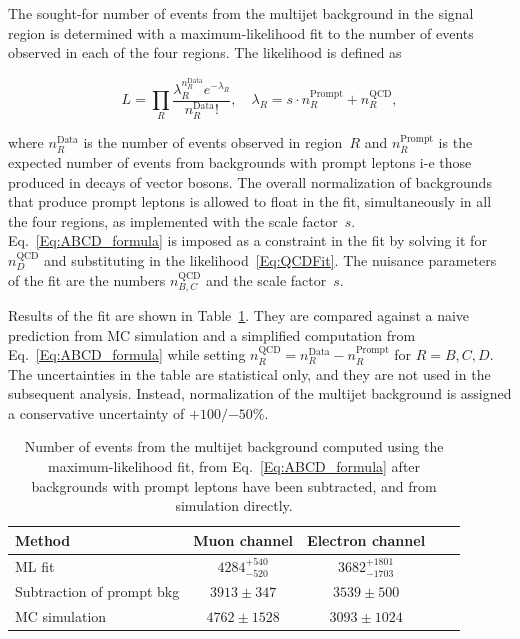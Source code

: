 The sought-for number of events from the multijet background in the signal region is determined with a maximum-likelihood fit to the number of events observed in each of the four regions.
The likelihood is defined as
\begin{linenomath}
\begin{equation}
  L = \prod_R \frac{\lambda_R^{n_R^\text{Data}} e^{-\lambda_R}}{n_R^\text{Data}!}, \quad \lambda_R = s \cdot n_R^\text{Prompt} + n_R^\text{QCD},
  \label{Eq:QCDFit}
\end{equation}
\end{linenomath}
where $n_R^\text{Data}$ is the number of events observed in region~$R$ and $n_R^\text{Prompt}$ is the expected number of events from backgrounds with prompt leptons i-e those produced in decays of vector bosons.
The overall normalization of backgrounds that produce prompt leptons is allowed to float in the fit, simultaneously in all the four regions, as implemented with the scale factor~$s$.
Eq.~\ref{Eq:ABCD_formula} is imposed as a constraint in the fit by solving it for $n_D^\text{QCD}$ and substituting in the likelihood~\eqref{Eq:QCDFit}.
The nuisance parameters of the fit are the numbers $n_{B,C}^\text{QCD}$ and the scale factor~$s$.

Results of the fit are shown in Table~\ref{Tab:QCDFit}.
They are compared against a naive prediction from MC simulation and a simplified computation from Eq.~\ref{Eq:ABCD_formula} while setting $n_R^\text{QCD} = n_R^\text{Data} - n_R^\text{Prompt}$ for $R = B, C, D$.
The uncertainties in the table are statistical only, and they are not used in the subsequent analysis.
Instead, normalization of the multijet background is assigned a conservative uncertainty of ${+100}/{-50}$\%.

\begin{table}
  \caption{Number of events from the multijet background computed using the maximum-likelihood fit, from Eq.~\ref{Eq:ABCD_formula} after backgrounds with prompt leptons have been subtracted, and from simulation directly.}
  \centering
  \begin{tabular}{lcccc}
    \hline
    \hline
    Method  & Muon channel  & Electron channel \\
    \hline
    ML fit                     & $4284^{+540}_{-520}$   & $3682^{+1801}_{-1703}$  \\
    Subtraction of prompt bkg  & $3913\pm 347$          & $3539\pm 500$           \\
    MC simulation              & $4762\pm 1528$         & $3093\pm 1024$          \\
    \hline
  \end{tabular}
  \label{Tab:QCDFit}
\end{table}

